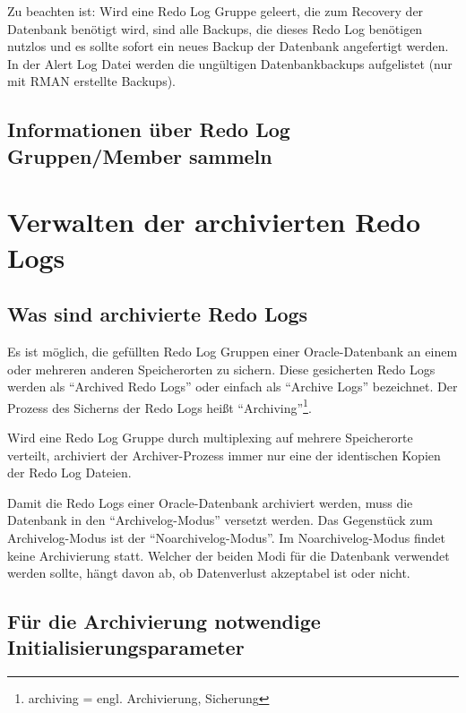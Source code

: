         \begin{merke}
          Zu beachten ist: Wird eine Redo Log Gruppe geleert, die zum Recovery der Datenbank benötigt wird, sind alle Backups, die dieses Redo Log benötigen nutzlos und es sollte sofort ein neues Backup der Datenbank angefertigt werden. In der Alert Log Datei werden die ungültigen Datenbankbackups aufgelistet (nur mit RMAN erstellte Backups).
        \end{merke}
      \subsection{Informationen über Redo Log Gruppen/Member sammeln}
        \begin{literaturinternet}
          \item \cite{i1007497}
        \end{literaturinternet}
    \section{Verwalten der archivierten Redo Logs}
    \label{administeringarchivelogs}
      \subsection{Was sind archivierte Redo Logs}
        Es ist möglich, die gefüllten Redo Log Gruppen einer Oracle-Datenbank an einem oder mehreren anderen Speicherorten zu sichern. Diese gesicherten Redo Logs werden als \enquote{Archived Redo Logs} oder einfach als \enquote{Archive Logs} bezeichnet. Der Prozess des Sicherns der Redo Logs heißt \enquote{Archiving}\footnote{archiving = engl. Archivierung, Sicherung}.
 
        \begin{merke}
          Wird eine Redo Log Gruppe durch multiplexing auf mehrere Speicherorte verteilt, archiviert der Archiver-Prozess immer nur eine der identischen Kopien der Redo Log Dateien.
        \end{merke}
        Damit die Redo Logs einer Oracle-Datenbank archiviert werden, muss die Datenbank in den \enquote{Archivelog-Modus} versetzt werden. Das Gegenstück zum Archivelog-Modus ist der \enquote{Noarchivelog-Modus}. Im Noarchivelog-Modus findet keine Archivierung statt.
        Welcher der beiden Modi für die Datenbank verwendet werden sollte, hängt davon ab, ob Datenverlust akzeptabel ist oder nicht.

      \subsection{Für die Archivierung notwendige Initialisierungsparameter}
